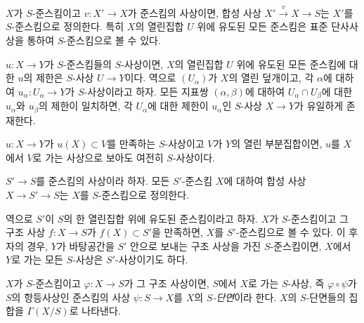 \begin{env}[2.5.3]
\label{I.2.5.3-ko}
$X$가 $S$-준스킴이고 $v:X'\to X$가 준스킴의 사상이면, 합성 사상
$X'\xrightarrow{v}X\to S$는 $X'$를 $S$-준스킴으로 정의한다. 특히
$X$의 열린집합 $U$ 위에 유도된 모든 준스킴은 표준 단사사상을
통하여 $S$-준스킴으로 볼 수 있다.

$u:X\to Y$가 $S$-준스킴들의 $S$-사상이면, $X$의 열린집합 $U$ 위에
유도된 모든 준스킴에 대한 $u$의 제한은 $S$-사상 $U\to Y$이다.
역으로 $(U_\alpha)$가 $X$의 열린 덮개이고, 각 $\alpha$에 대하여
$u_\alpha:U_\alpha\to Y$가 $S$-사상이라고 하자. 모든 지표쌍
$(\alpha,\beta)$에 대하여 $U_\alpha\cap U_\beta$에 대한
$u_\alpha$와 $u_\beta$의 제한이 일치하면, 각 $U_\alpha$에 대한
제한이 $u_\alpha$인 $S$-사상 $X\to Y$가 유일하게 존재한다.

$u:X\to Y$가 $u(X)\subset V$를 만족하는 $S$-사상이고 $V$가 $Y$의
열린 부분집합이면, $u$를 $X$에서 $V$로 가는 사상으로 보아도 여전히
$S$-사상이다.
\end{env}

\begin{env}[2.5.4]
\label{I.2.5.4-ko}
$S'\to S$를 준스킴의 사상이라 하자. 모든 $S'$-준스킴 $X$에 대하여
합성 사상 $X\to S'\to S$는 $X$를 $S$-준스킴으로 정의한다.

역으로 $S'$이 $S$의 한 열린집합 위에 유도된 준스킴이라고 하자.
$X$가 $S$-준스킴이고 그 구조 사상 $f:X\to S$가
$f(X)\subset S'$을 만족하면, $X$를 $S'$-준스킴으로 볼 수 있다.
이 후자의 경우, $Y$가 바탕공간을 $S'$ 안으로 보내는 구조 사상을
가진 $S$-준스킴이면, $X$에서 $Y$로 가는 모든 $S$-사상은
$S'$-사상이기도 하다.
\end{env}

\begin{env}[2.5.5]
\label{I.2.5.5-ko}
$X$가 $S$-준스킴이고 $\varphi:X\to S$가 그 구조 사상이면,
$S$에서 $X$로 가는 $S$-사상, 즉 $\varphi\circ\psi$가 $S$의
항등사상인 준스킴의 사상 $\psi:S\to X$를 $X$의
\emph{$S$-단면}이라 한다. $X$의 $S$-단면들의 집합을
$\Gamma(X/S)$로 나타낸다.
\end{env}
